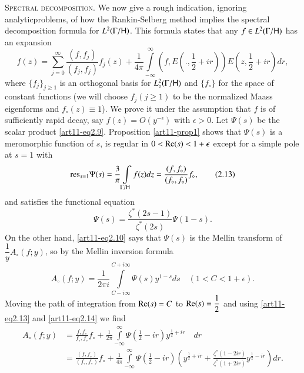 \medskip
\noindent
\textsc{Spectral decomposition.} We now give a rough indication, ignoring analytic\pageoriginale problems, of how the Rankin-Selberg method implies the spectral decomposition formula for $L^2 (\Gamma / \mathsf{H})$. This formula states that any $f \in L^2 (\Gamma / \mathsf{H})$ has an expansion
\begin{equation*}
f(z) = \sum\limits^\infty_{j=0} \frac{(f, f_j)}{(f_j, f_j)} f_j(z) + \frac{1}{4\pi} \int\limits^\infty_{-\infty} (f, E (., \frac{1}{2} + ir)) E (z, \frac{1}{2} + ir) dr, \tag{2.12} \label{art11-eq2.12}
\end{equation*}
where $\{f_j\}_{j \geq 1}$ is an orthogonal basis for $L^2_\circ (\Gamma / \mathsf{H})$ and $\{f_\circ\}$ for the space of constant functions (we will choose $f_j(j \geq 1)$ to be the normalized Maass eigenforms and $f_\circ (z) \equiv 1$). We prove it under the assumption that $f$ is of sufficiently rapid decay, say $f(z) = O(y^{-\epsilon})$ with $\epsilon >0$. Let $\Psi (s)$  be the scalar product \eqref{art11-eq2.9}. Proposition \ref{art11-prop1} shows that $\Psi (s)$ is a meromorphic function of $s$, is regular in $0  < \operatorname{Re} (s) <1 +\epsilon$ except  for a simple pole at $s =1$ with 
\begin{equation*}
\mathrm{res}_{s=1} \Psi (s) = \frac{3}{\pi} \int\limits_{\Gamma / \mathsf{H}} f(z) dz = \frac{(f, f_\circ)}{(f_\circ, f_\circ)}  f_\circ,
\tag{2.13}\label{art11-eq2.13}
\end{equation*}
and satisfies the functional equation 
\begin{equation*}
\Psi (s) = \frac{\zeta^\ast (2s -1)}{\zeta^\ast(2s)} \Psi (1-s). \tag{2.14}\label{art11-eq2.14}
\end{equation*}
On the other hand, \eqref{art11-eq2.10} says that $\Psi (s)$ is the Mellin transform of $\dfrac{1}{y}A_\circ (f;y)$, so by the Mellin inversion formula
$$
A_\circ (f;y) = \frac{1}{2 \pi i} \int\limits^{C + i \infty}_{C - i \infty} \Psi (s) y^{1-s} ds \quad  (1< C < 1+ \epsilon) .
$$
Moving the path of integration from $\operatorname{Re} (s) = C$ to $\operatorname{Re} (s) = \dfrac{1}{2}$ and using \eqref{art11-eq2.13} and \eqref{art11-eq2.14} we find 
\begin{align*}
A_\circ (f;y) & = \frac{f, f_\circ}{f_\circ, f_\circ} f_\circ + \frac{1}{2\pi} \int\limits^\infty_{-\infty} \Psi (\frac{1}{2} - ir) y^{\frac{1}{2}  + ir} \quad dr\\
& = \frac{(f, f_\circ)}{(f_\circ, f_\circ)}  f_\circ + \frac{1}{4\pi} \int\limits^\infty_{-\infty}  \Psi (\frac{1}{2} - ir) (y^{\frac{1}{2} + ir} + \frac{\zeta^\ast (1-2ir)}{\zeta^\ast (1+ 2 ir)} y^{\frac{1}{2} - ir}) dr. \tag{2.15}\label{art11-eq2.15}
\end{align*}\pageoriginale
